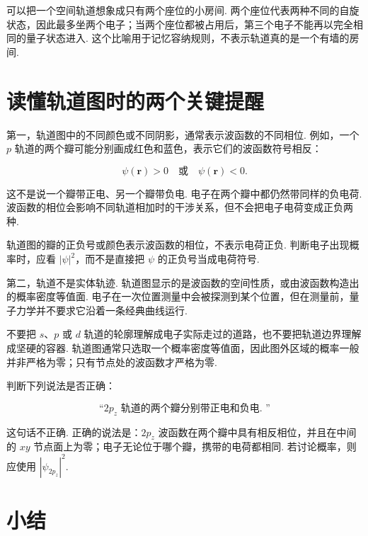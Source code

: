 \documentclass[UTF8,11pt,a4paper,openany]{ctexbook}
\begin{document}
\begin{analogybox}
可以把一个空间轨道想象成只有两个座位的小房间. 两个座位代表两种不同的自旋状态，因此最多坐两个电子；当两个座位都被占用后，第三个电子不能再以完全相同的量子状态进入. 这个比喻用于记忆容纳规则，不表示轨道真的是一个有墙的房间. 
\end{analogybox}

\section{读懂轨道图时的两个关键提醒}

第一，轨道图中的不同颜色或不同阴影，通常表示波函数的不同相位. 例如，一个 $p$ 轨道的两个瓣可能分别画成红色和蓝色，表示它们的波函数符号相反：

\[
\psi(\mathbf r)>0
\quad\text{或}\quad
\psi(\mathbf r)<0.
\]

这不是说一个瓣带正电、另一个瓣带负电. 电子在两个瓣中都仍然带同样的负电荷. 波函数的相位会影响不同轨道相加时的干涉关系，但不会把电子电荷变成正负两种. 

\begin{limitbox}
轨道图的瓣的正负号或颜色表示波函数的相位，不表示电荷正负. 判断电子出现概率时，应看 $\left|\psi\right|^2$，而不是直接把 $\psi$ 的正负号当成电荷符号. 
\end{limitbox}

第二，轨道不是实体轨迹. 轨道图显示的是波函数的空间性质，或由波函数构造出的概率密度等值面. 电子在一次位置测量中会被探测到某个位置，但在测量前，量子力学并不要求它沿着一条经典曲线运行. 

\begin{limitbox}
不要把 $s$、$p$ 或 $d$ 轨道的轮廓理解成电子实际走过的道路，也不要把轨道边界理解成坚硬的容器. 轨道图通常只选取一个概率密度等值面，因此图外区域的概率一般并非严格为零；只有节点处的波函数才严格为零. 
\end{limitbox}

\begin{examplebox}
判断下列说法是否正确：

\[
\text{“}2p_z\text{ 轨道的两个瓣分别带正电和负电. ”}
\]

这句话不正确. 正确的说法是：$2p_z$ 波函数在两个瓣中具有相反相位，并且在中间的 $xy$ 节点面上为零；电子无论位于哪个瓣，携带的电荷都相同. 若讨论概率，则应使用 $\left|\psi_{2p_z}\right|^2$. 
\end{examplebox}

\section{小结}
\end{document}

